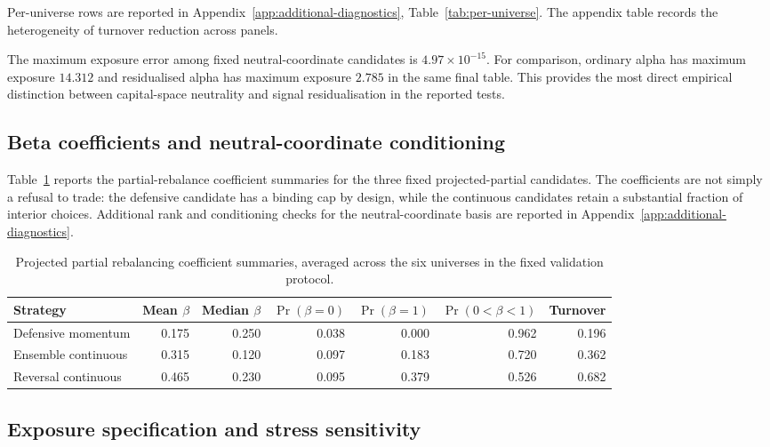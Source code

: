 \documentclass[11pt]{article}
\begin{document}
Per-universe rows are reported in Appendix~\ref{app:additional-diagnostics}, Table~\ref{tab:per-universe}.  The appendix table records the heterogeneity of turnover reduction across panels.


\FloatBarrier

The maximum exposure error among fixed neutral-coordinate candidates is $4.97\times10^{-15}$.  For comparison,
ordinary alpha has maximum exposure $14.312$ and residualised alpha has maximum exposure $2.785$ in
the same final table.  This provides the most direct empirical distinction between capital-space neutrality
and signal residualisation in the reported tests.

\subsection{Beta coefficients and neutral-coordinate conditioning}

Table~\ref{tab:beta-diagnostics} reports the partial-rebalance coefficient summaries for the three fixed
projected-partial candidates.  The coefficients are not simply a refusal to trade: the defensive candidate
has a binding cap by design, while the continuous candidates retain a substantial fraction of interior
choices.  Additional rank and conditioning checks for the neutral-coordinate basis are reported in Appendix~\ref{app:additional-diagnostics}.

\begin{table}[!htbp]
\centering
\small
\begin{tabular}{lrrrrrr}
\toprule
Strategy & Mean $\beta$ & Median $\beta$ & $\Pr(\beta=0)$ & $\Pr(\beta=1)$ & $\Pr(0<\beta<1)$ & Turnover \\
\midrule
Defensive momentum & 0.175 & 0.250 & 0.038 & 0.000 & 0.962 & 0.196 \\
Ensemble continuous & 0.315 & 0.120 & 0.097 & 0.183 & 0.720 & 0.362 \\
Reversal continuous & 0.465 & 0.230 & 0.095 & 0.379 & 0.526 & 0.682 \\
\bottomrule
\end{tabular}
\caption{Projected partial rebalancing coefficient summaries, averaged across the six universes in the fixed validation protocol.}
\label{tab:beta-diagnostics}
\end{table}


\subsection{Exposure specification and stress sensitivity}
\label{sec:exposure-specification}
\end{document}
